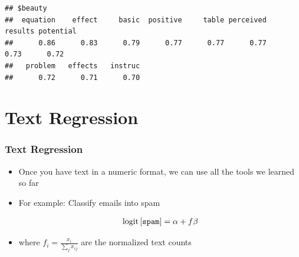 \documentclass[
  shownotes,
  xcolor={svgnames},
  hyperref={colorlinks,citecolor=DarkBlue,linkcolor=DarkRed,urlcolor=DarkBlue}
  , aspectratio=169]{beamer}
\newcommand{\mr}[1]{\mathrm{#1}}
\begin{document}
\begin{frame}[fragile]
\begin{tiny}
\begin{verbatim}
## $beauty
##  equation    effect     basic  positive     table perceived   results potential 
##      0.86      0.83      0.79      0.77      0.77      0.77      0.73      0.72 
##   problem   effects   instruc 
##      0.72      0.71      0.70
\end{verbatim}
\end{tiny}

\end{frame}
\section{Text Regression}
\begin{frame}
\frametitle{Text Regression}

\begin{itemize}
\item Once you have text in a numeric format, we can use all the tools we learned so far

\medskip

\item For example: Classify emails into spam

\begin{align}
\mr{logit}\left[{\tt spam} \right] = \alpha + f \beta
\end{align}
\item where $f_i=\frac{x_i}{\sum_j x_{ij}}$ are the normalized text counts

\end{itemize}

\end{frame}

\end{document}
